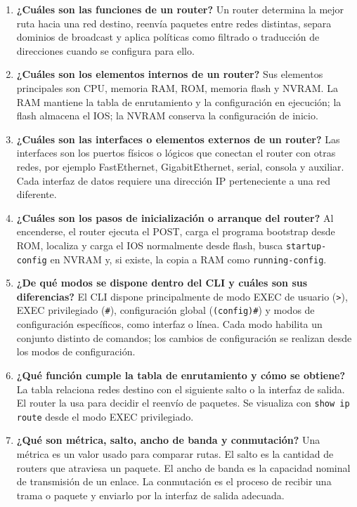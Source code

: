 \documentclass[a4paper,12pt]{article}
\begin{document}
\begin{enumerate}[label=6.1.\alph*)]
    \item \textbf{¿Cuáles son las funciones de un router?} Un router determina la mejor ruta hacia una red destino, reenvía paquetes entre redes distintas, separa dominios de broadcast y aplica políticas como filtrado o traducción de direcciones cuando se configura para ello.
    \item \textbf{¿Cuáles son los elementos internos de un router?} Sus elementos principales son CPU, memoria RAM, ROM, memoria flash y NVRAM. La RAM mantiene la tabla de enrutamiento y la configuración en ejecución; la flash almacena el IOS; la NVRAM conserva la configuración de inicio.
    \item \textbf{¿Cuáles son las interfaces o elementos externos de un router?} Las interfaces son los puertos físicos o lógicos que conectan el router con otras redes, por ejemplo FastEthernet, GigabitEthernet, serial, consola y auxiliar. Cada interfaz de datos requiere una dirección IP perteneciente a una red diferente.
    \item \textbf{¿Cuáles son los pasos de inicialización o arranque del router?} Al encenderse, el router ejecuta el POST, carga el programa bootstrap desde ROM, localiza y carga el IOS normalmente desde flash, busca \texttt{startup-config} en NVRAM y, si existe, la copia a RAM como \texttt{running-config}.
    \item \textbf{¿De qué modos se dispone dentro del CLI y cuáles son sus diferencias?} El CLI dispone principalmente de modo EXEC de usuario (\texttt{>}), EXEC privilegiado (\texttt{\#}), configuración global (\texttt{(config)\#}) y modos de configuración específicos, como interfaz o línea. Cada modo habilita un conjunto distinto de comandos; los cambios de configuración se realizan desde los modos de configuración.
    \item \textbf{¿Qué función cumple la tabla de enrutamiento y cómo se obtiene?} La tabla relaciona redes destino con el siguiente salto o la interfaz de salida. El router la usa para decidir el reenvío de paquetes. Se visualiza con \texttt{show ip route} desde el modo EXEC privilegiado.
    \item \textbf{¿Qué son métrica, salto, ancho de banda y conmutación?} Una métrica es un valor usado para comparar rutas. El salto es la cantidad de routers que atraviesa un paquete. El ancho de banda es la capacidad nominal de transmisión de un enlace. La conmutación es el proceso de recibir una trama o paquete y enviarlo por la interfaz de salida adecuada.

\end{enumerate}
\end{document}
